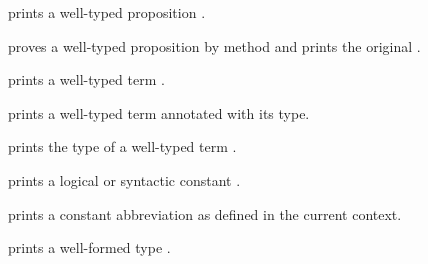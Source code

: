 \begin{isabellebody}
\begin{isamarkuptext}
\begin{description}
  \item {} prints a well-typed proposition \isa{{\isachardoublequote}{\isasymphi}{\isachardoublequote}}.

  \item {} proves a well-typed proposition
  \isa{{\isachardoublequote}{\isasymphi}{\isachardoublequote}} by method  and prints the original \isa{{\isachardoublequote}{\isasymphi}{\isachardoublequote}}.

  \item {} prints a well-typed term .

  \item {} prints a well-typed term 
  annotated with its type.

  \item {} prints the type of a well-typed term
  .

  \item {} prints a logical or syntactic constant
  .
  
  \item {} prints a constant abbreviation
   as defined in the current context.
  \item {} prints a well-formed type \isa{{\isachardoublequote}{\isasymtau}{\isachardoublequote}}.
  

\end{description}
\end{isamarkuptext}
\end{isabellebody}
